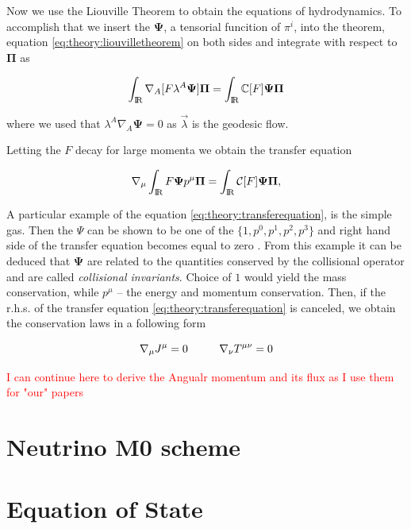 \documentclass[11pt,a4paper,headinclude=true,DIV=14,BCOR=8mm,chapterprefix,listof=totoc,twoside,openright,abstracton]{scrbook}
\newcommand{\red}[1]{\textcolor{red}{#1}}
\begin{document}
Now we use the Liouville Theorem to obtain the equations of hydrodynamics. To accomplish that we insert the $\boldsymbol{\Psi}$, a tensorial funcition of $\pi^i$, into the theorem, equation \ref{eq:theory:liouvilletheorem} on both sides and integrate with respect to $\boldsymbol{\Pi}$ as

\begin{equation}
\int_{\text{I\!R}}\nabla_{A}[F\lambda^A\boldsymbol{\Psi}]\boldsymbol{\Pi}=\int_{\text{I\!R}}\mathbb{C}[F]\boldsymbol{\Psi}\boldsymbol{\Pi}
\end{equation}

where we used that $\lambda^A\nabla_{A}\boldsymbol{\Psi}=0$ as $\vec{\lambda}$ is the geodesic flow. 

Letting the $F$ decay for large momenta we obtain the transfer equation \cite{Israel:1963,Cercignani:2002}

\begin{equation}
\nabla_{\mu}\int_{\text{I\!R}} F\boldsymbol{\Psi}p^{\mu}\boldsymbol{\Pi} =\int_{\text{I\!R}} \mathcal{C}[F]\boldsymbol{\Psi}\boldsymbol{\Pi},
\label{eq:theory:transferequation}
\end{equation}

A particular example of the equation \ref{eq:theory:transferequation}, is the simple gas. Then the $\Psi$ can be shown to be one of the $\{1,p^0,p^1,p^2,p^3\}$ and right hand side of the transfer equation becomes equal to zero \cite{Cercignani:2002}. From this example it can be deduced that $\boldsymbol{\Psi}$ are related to the quantities conserved by the collisional operator and are called \textit{collisional invariants}. Choice of $1$ would yield the mass conservation, while $p^{\mu}$ -- the energy and momentum conservation. Then, if the r.h.s. of the transfer equation \ref{eq:theory:transferequation} is canceled, we obtain the conservation laws in a following form

\begin{equation}
\nabla_{\mu}J^{\mu} =0 \hspace{10mm}\nabla_{\nu}T^{\mu\nu} =0
\end{equation}

\red{I can continue here to derive the Angualr momentum and its flux as I use them for "our" papers}

\section{Neutrino M0 scheme}
\section{Equation of State}
\end{document}
